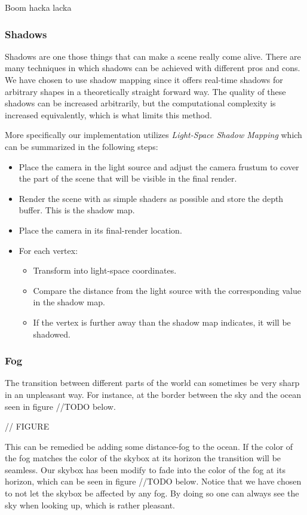 Boom hacka lacka

\subsubsection{Shadows}
Shadows are one those things that can make a scene really come alive. There are many techniques in which shadows can be achieved with different pros and cons. We have chosen to use shadow mapping since it offers real-time shadows for arbitrary shapes in a theoretically straight forward way. The quality of these shadows can be increased arbitrarily, but the computational complexity is increased equivalently, which is what limits this method. 

More specifically our implementation utilizes \textit{Light-Space Shadow Mapping} which can be summarized in the following steps:

\begin{itemize}
\item Place the camera in the light source and adjust the camera frustum to cover the part of the scene that will be visible in the final render.
\item Render the scene with as simple shaders as possible and store the depth buffer. This is the shadow map.
\item Place the camera in its final-render location.
\item For each vertex:
\begin{itemize}
\item Transform into light-space coordinates.
\item Compare the distance from the light source with the corresponding value in the shadow map.
\item If the vertex is further away than the shadow map indicates, it will be shadowed. 
\end{itemize}
\end{itemize}



\subsubsection{Fog}
The transition between different parts of the world can sometimes be very sharp in an unpleasant way. For instance, at the border between the sky and the ocean seen in figure //TODO below. 

// FIGURE

This can be remedied be adding some distance-fog to the ocean. If the color of the fog matches the color of the skybox at its horizon the transition will be seamless. Our skybox has been modify to fade into the color of the fog at its horizon, which can be seen in figure //TODO below. Notice that we have chosen to not let the skybox be affected by any fog. By doing so one can always see the sky when looking up, which is rather pleasant. 

